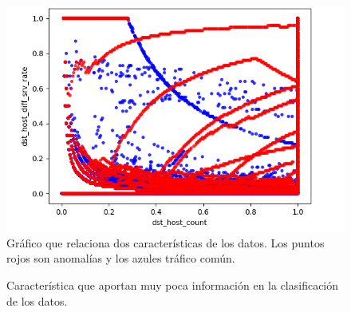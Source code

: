 \begin{figure}[b]
    \includegraphics[width=\linewidth]{Images/dst_host_count-dst_host_diff_srv_rate.png}
    \caption{Gráfico que relaciona dos características de los datos. Los puntos rojos son anomalías y los azules tráfico común.}
    \label{fig:entropy}
\end{figure}

\begin{figure}[t]
    \centering

    \caption{Característica que aportan muy poca información en la clasificación de los datos.}
    \label{fig:redundant}
\end{figure}

